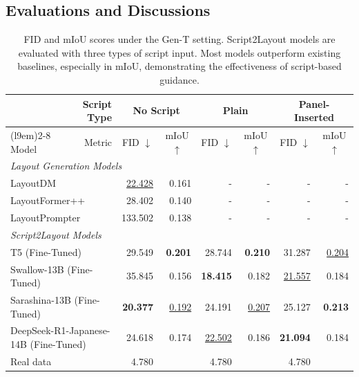 \documentclass[sigconf, screen, review, anonymous]{acmart}
\begin{document}
\subsection{Evaluations and Discussions}
\begin{table}[t]
\renewcommand{\arraystretch}{1.0}
\caption{
FID and mIoU scores under the Gen-T setting. Script2Layout models are evaluated with three types of script input. Most models outperform existing baselines, especially in mIoU, demonstrating the effectiveness of script-based guidance.
}
\label{tab:results}
\begin{tabular}{llrrrrrr}
\toprule
&\multicolumn{1}{r}{Script Type} & \multicolumn{2}{c}{No Script} & \multicolumn{2}{c}{Plain} & \multicolumn{2}{c}{Panel-Inserted} \\
\cmidrule(l{9em}){2-8}
Model & \multicolumn{1}{r}{Metric} 
 & \multicolumn{1}{c}{FID $\downarrow$} 
 & \multicolumn{1}{c}{mIoU $\uparrow$}
 & \multicolumn{1}{c}{FID $\downarrow$}
 & \multicolumn{1}{c}{mIoU $\uparrow$}
 & \multicolumn{1}{c}{FID $\downarrow$}
 & \multicolumn{1}{c}{mIoU $\uparrow$} \\
\midrule
\multicolumn{7}{l}{\it Layout Generation Models} \\%
\multicolumn{2}{l}{\hspace{0.5em}LayoutDM} & \underline{22.428} & 0.161 & - & - & - & - \\
\multicolumn{2}{l}{\hspace{0.5em}LayoutFormer++} & 28.402 & 0.140 & - & - & - & - \\
\multicolumn{2}{l}{\hspace{0.5em}LayoutPrompter} & 133.502 & 0.138 & - & - & - & - \\
\midrule[0.01em]
\multicolumn{7}{l}{\it Script2Layout Models} \\%
\multicolumn{2}{l}{\hspace{0.5em}T5 (Fine-Tuned)} & 29.549 & \textbf{0.201} & 28.744 & \textbf{0.210} & 31.287 & \underline{0.204} \\
\multicolumn{2}{l}{\hspace{0.5em}Swallow-13B (Fine-Tuned)} & 35.845 & 0.156 & \textbf{18.415} & 0.182 & \underline{21.557} & 0.184 \\
\multicolumn{2}{l}{\hspace{0.5em}Sarashina-13B (Fine-Tuned)} & \textbf{20.377} & \underline{0.192} & 24.191 & \underline{0.207} & 25.127 & \textbf{0.213} \\
\multicolumn{2}{l}{\hspace{0.5em}DeepSeek-R1-Japanese-14B (Fine-Tuned)} & 24.618 & 0.174 & \underline{22.502} & 0.186 & \textbf{21.094} & 0.184 \\
\midrule[0.01em]
\multicolumn{2}{l}{Real data} & 4.780 & & 4.780 & & 4.780 & \\
\bottomrule
\end{tabular}
\end{table}
\end{document}
